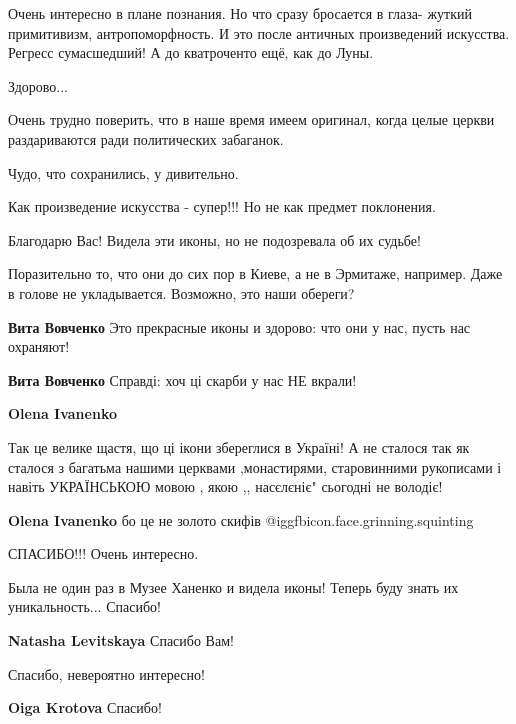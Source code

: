 \begin{itemize}

Очень интересно в плане познания. Но что сразу бросается в глаза- жуткий
примитивизм, антропоморфность. И это после античных произведений
искусства. Регресс сумасшедший! А до кватроченто ещё, как до Луны.


Здорово...

Очень трудно поверить, что в наше время имеем оригинал, когда целые церкви раздариваются ради политических забаганок.

Чудо, что сохранились, у дивительно.

Как произведение искусства - супер!!! Но не как предмет поклонения.

Благодарю Вас! Видела эти иконы, но не подозревала об их судьбе!


Поразительно то, что они до сих пор в Киеве, а не в Эрмитаже, например. Даже в
голове не укладывается. Возможно, это наши обереги?

\begin{itemize} %
\textbf{Вита Вовченко} Это прекрасные иконы и здорово: что они у нас, пусть нас охраняют!

\textbf{Вита Вовченко} Справді: хоч ці скарби у нас НЕ вкрали!

\textbf{Olena Ivanenko} 

Так це велике щастя, що ці ікони збереглися в Україні! А не сталося так як
сталося з багатьма нашими церквами ,монастирями, старовинними рукописами і
навіть УКРАЇНСЬКОЮ мовою , якою ,, насєлєніє" сьогодні не володіє!

\textbf{Olena Ivanenko} бо це не золото скифів @igg{fbicon.face.grinning.squinting} 

\end{itemize} %

СПАСИБО!!! Очень интересно.


Была не один раз в Музее Ханенко и видела иконы! Теперь буду знать их
уникальность... Спасибо!


\textbf{Natasha Levitskaya} Спасибо Вам!

Спасибо, невероятно интересно!

\textbf{Oiga Krotova} Спасибо!


\end{itemize}
